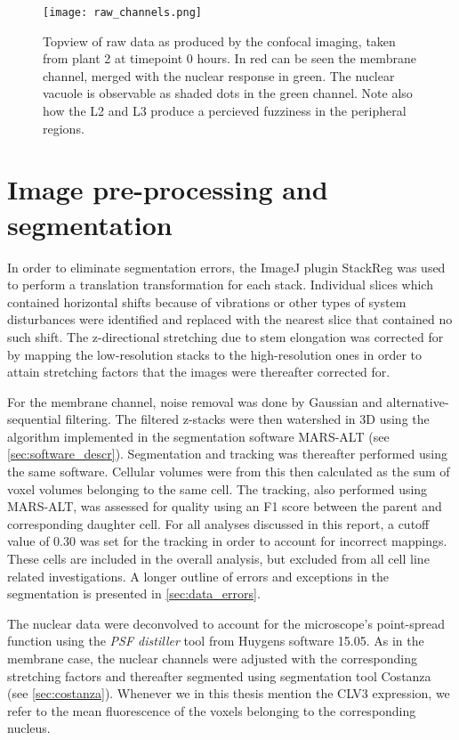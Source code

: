 \begin{figure}[H]
  \centering
  \texttt{[image: raw\_channels.png]}
  \caption[Confocal microscopy data]{Topview of raw data as produced by the
    confocal imaging, taken from plant 2 at timepoint 0 hours. In red can be
    seen the membrane channel, merged with the
    nuclear response in green. The nuclear vacuole is observable as shaded dots
    in the green channel. Note also how the L2 and L3 produce a percieved
    fuzziness in the peripheral regions.}
  \label{fig:rawdata}
\end{figure}

\section[Processed image data]{Image pre-processing and segmentation}
In order to eliminate segmentation errors, the ImageJ plugin StackReg was used
to perform a translation transformation for each stack. Individual slices which
contained horizontal shifts because of vibrations or other types of system
disturbances were identified and replaced with the nearest slice that contained
no such shift. The z-directional stretching due to stem elongation was corrected for by mapping
the low-resolution stacks to the high-resolution ones in order to attain
stretching factors that the images were thereafter corrected for. 

For the membrane channel, noise removal was done by Gaussian and alternative-sequential
filtering. The filtered z-stacks were then watershed in 3D using the
algorithm implemented in the segmentation software MARS-ALT (see
\cref{sec:software_descr}). Segmentation and
tracking was thereafter performed using the same software. Cellular volumes were from
this then calculated as the sum of voxel volumes belonging to the same cell.
The tracking, also performed using MARS-ALT, was assessed for quality using an F1
score between the parent and corresponding daughter cell. For all analyses
discussed in this report, a cutoff value of 0.30 was set for the tracking in
order to account for incorrect mappings. These cells are included in the
overall analysis, but excluded from all cell line related investigations.
A longer outline of errors and exceptions in the segmentation is presented in
\cref{sec:data_errors}.   

The nuclear data were deconvolved to account for the microscope's point-spread
function using the \textit{PSF distiller} tool from Huygens software 15.05. As
in the membrane case, the nuclear channels were adjusted with the  
corresponding stretching factors and thereafter segmented using segmentation
tool Costanza~\cite{costanza} (see \cref{sec:costanza}). Whenever we in this
thesis mention the CLV3 expression, we refer to the mean fluorescence of the
voxels belonging to the corresponding nucleus. 

